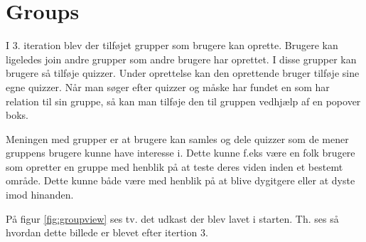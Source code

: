 \section{Groups}

I 3. iteration blev der tilføjet grupper som brugere kan oprette. Brugere kan ligeledes join andre grupper som andre brugere har oprettet. I disse grupper kan brugere så tilføje quizzer. Under oprettelse kan den oprettende bruger tilføje sine egne quizzer. Når man søger efter quizzer og måske har fundet en som har relation til sin gruppe, så kan man tilføje den til gruppen vedhjælp af en popover boks.

Meningen med grupper er at brugere kan samles og dele quizzer som de mener gruppens brugere kunne have interesse i. Dette kunne f.eks være en folk brugere som opretter en gruppe med henblik på at teste deres viden inden et bestemt område. Dette kunne både være med henblik på at blive dygitgere eller at dyste imod hinanden.



På figur \ref{fig:groupview} ses tv. det udkast der blev lavet i starten. Th. ses så hvordan dette billede er blevet efter itertion 3.